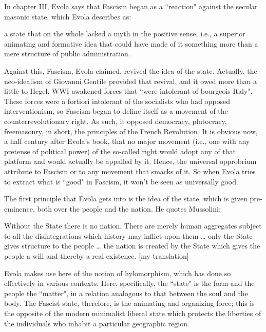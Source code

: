 In chapter III, Evola says that Fascism began as a ``reaction" against the secular masonic state, which Evola describes as:

\begin{quotex}
a state that on the whole lacked a myth in the positive sense, i.e., a superior animating and formative idea that could have made of it something more than a mere structure of public administration. 

\end{quotex}
Against this, Fascism, Evola claimed, revived the idea of the state. Actually, the neo-idealism of Giovanni Gentile provided that revival, and it owed more than a little to Hegel. WWI awakened forces that ``were intolerant of bourgeois Italy". These forces were a fortiori intolerant of the socialists who had opposed interventionism, so Fascism began to define itself as a movement of the counterrevolutionary right. As such, it opposed democracy, plutocracy, freemasonry, in short, the principles of the French Revolution. It is obvious now, a half century after Evola's book, that no major movement (i.e., one with any pretense of political power) of the so-called right would adopt any of that platform and would actually be appalled by it. Hence, the universal opprobrium attribute to Fascism or to any movement that smacks of it. So when Evola tries to extract what is ``good" in Fascism, it won't be seen as universally good.

The first principle that Evola gets into is the idea of the state, which is given pre-eminence, both over the people and the nation. He quotes Mussolini:

\begin{quotex}
Without the State there is no nation. There are merely human aggregates subject to all the disintegrations which history may inflict upon them … only the State gives structure to the people … the nation is created by the State which gives the people a will and thereby a real existence. [my translation] 

\end{quotex}
Evola makes use here of the notion of hylomorphism, which has done so effectively in various contexts. Here, specifically, the ``state" is the form and the people the ``matter", in a relation analogous to that between the soul and the body. The Fascist state, therefore, is the animating and organizing force; this is the opposite of the modern minimalist liberal state which protects the liberties of the individuals who inhabit a particular geographic region.

